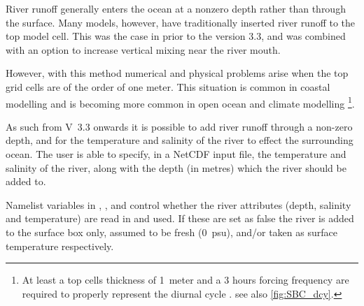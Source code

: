 \documentclass[../tex_main/NEMO_manual]{subfiles}
\begin{document}




River runoff generally enters the ocean at a nonzero depth rather than through the surface.
Many models, however, have traditionally inserted river runoff to the top model cell.
This was the case in \NEMO prior to the version 3.3, and was combined with an option 
to increase vertical mixing near the river mouth.

However, with this method numerical and physical problems arise when the top grid cells are 
of the order of one meter. This situation is common in coastal modelling and is becoming 
more common in open ocean and climate modelling 
\footnote{At least a top cells thickness of 1~meter and a 3 hours forcing frequency are
required to properly represent the diurnal cycle \citep{Bernie_al_JC05}. see also \autoref{fig:SBC_dcy}.}.

As such from V~3.3 onwards it is possible to add river runoff through a non-zero depth, and for the 
temperature and salinity of the river to effect the surrounding ocean.
The user is able to specify, in a NetCDF input file, the temperature and salinity of the river, along with the   
depth (in metres) which the river should be added to.

Namelist variables in , ,  and  control whether 
the river attributes (depth, salinity and temperature) are read in and used.  If these are set 
as false the river is added to the surface box only, assumed to be fresh (0~psu), and/or 
taken as surface temperature respectively.
\end{document}
